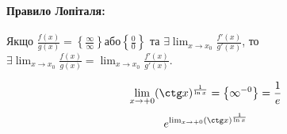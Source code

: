 \documentclass[../rgr1.tex]{subfiles}
\begin{document}

\paragraph{Правило Лопіталя:}
Якщо $\frac{f(x)}{g(x)}=\left\{ \frac{\infty}{\infty} \right\} \text{або} \left\{\frac{0}{0} \right\}$ та $\exists \lim_{x\to x_0}\frac{f'(x)}{g'(x)}$, то
$ \exists \lim_{x\to x_0}\frac{f(x)}{g(x)} = \lim_{x\to x_0}\frac{f'(x)}{g'(x)}.$

\Solution

\begin{equation}
	\lim_{x\to+0}(\ctg x)^{\frac{1}{\ln x}} = \left\{ \infty^{-0} \right\} = \frac{1}{e}
\end{equation}
\begin{equation}
	e^{\lim_{x\to+0}(\ctg x)^{\frac{1}{\ln x}}}
\end{equation}

\Answer{<++>}
\end{document}
